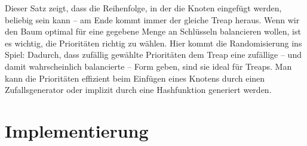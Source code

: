 \documentclass[a4paper]{scrreprt}
\theoremstyle{definition}
\begin{document}
Dieser Satz zeigt, dass die Reihenfolge, in der die Knoten eingefügt werden, beliebig sein kann -- am Ende kommt immer der gleiche Treap heraus.
Wenn wir den Baum optimal für eine gegebene Menge an Schlüsseln balancieren wollen, ist es wichtig, die Prioritäten richtig zu wählen.
Hier kommt die Randomisierung ins Spiel:
Dadurch, dass zufällig gewählte Prioritäten dem Treap eine zufällige -- und damit wahrscheinlich balancierte -- Form geben, sind sie ideal für Treaps.
Man kann die Prioritäten effizient beim Einfügen eines Knotens durch einen Zufallsgenerator oder implizit durch eine Hashfunktion generiert werden.

\section{Implementierung}
\label{sec:implementing}
\end{document}

